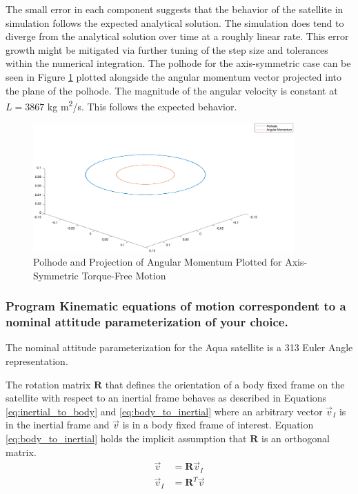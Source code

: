 The small error in each component suggests that the behavior of the satellite in simulation follows the expected analytical solution. The simulation does tend to diverge from the analytical solution over time at a roughly linear rate. This error growth might be mitigated via further tuning of the step size and tolerances within the numerical integration. The polhode for the axis-symmetric case can be seen in Figure \ref{fig:axis_symmetric_polhode} plotted alongside the angular momentum vector projected into the plane of the polhode. The magnitude of the angular velocity is constant at $L = 3867$ kg m\textsuperscript{2}/s. This follows the expected behavior.

\begin{figure}[H]
    \centering
    \captionsetup{justification = centering}
    \includegraphics[width = 10cm]{Images/axis_symmetric_polhode.png}
    \caption{Polhode and Projection of Angular Momentum Plotted for Axis-Symmetric Torque-Free Motion}
    \label{fig:axis_symmetric_polhode}
\end{figure}

\subsubsection{Program Kinematic equations of motion correspondent to a nominal attitude parameterization of your choice.}

The nominal attitude parameterization for the Aqua satellite is a 313 Euler Angle representation. 

The rotation matrix $\boldsymbol{R}$ that defines the orientation of a body fixed frame on the satellite with respect to an inertial frame behaves as described in Equations \ref{eq:inertial_to_body} and \ref{eq:body_to_inertial} where an arbitrary vector $\vec{v}_I$ is in the inertial frame and $\vec{v}$ is in a body fixed frame of interest. Equation \ref{eq:body_to_inertial} holds the implicit assumption that $\boldsymbol{R}$ is an orthogonal matrix. 
\begin{eqnarray}
    \vec{v} &= \boldsymbol{R} \vec{v}_I \label{eq:inertial_to_body} \\
    \vec{v}_I &= \boldsymbol{R}^T \vec{v} \label{eq:body_to_inertial}
\end{eqnarray}

